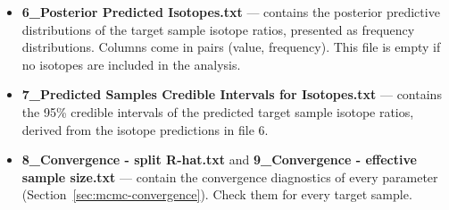 \documentclass[12pt]{report}
\begin{document}
\begin{itemize}
    \begin{figure}[ht]
        \centering
            \begin{minipage}{0.92\textwidth}
\small
\begin{verbatim}
210PbXs:[1.05371,1.20068]
Calcium:[11122.9,13035.6]
Cs137:[0.313266,0.361052]
Iron:[11319.5,12662.4]
N:[0.32774,0.364495]
Potassium:[830.868,944.254]
\end{verbatim}
    \end{minipage}
        \caption{The 95\% credible intervals of the predicted constituents of target sample CTAIL1 (\texttt{5\_Predicted Samples Credible Intervals.txt}).}
        \label{fig:posterior-95-predicted-table}
    \end{figure}
    \FloatBarrier

    \item \textbf{6\_Posterior Predicted Isotopes.txt} --- contains the posterior predictive distributions of the target sample isotope ratios, presented as frequency distributions. Columns come in pairs (value, frequency). This file is empty if no isotopes are included in the analysis.
    \item \textbf{7\_Predicted Samples Credible Intervals for Isotopes.txt} --- contains the 95\% credible intervals of the predicted target sample isotope ratios, derived from the isotope predictions in file 6.
    \item \textbf{8\_Convergence - split R-hat.txt} and \textbf{9\_Convergence - effective sample size.txt} --- contain the convergence diagnostics of every parameter (Section~\ref{sec:mcmc-convergence}). Check them for every target sample.
\end{itemize}
\end{document}
